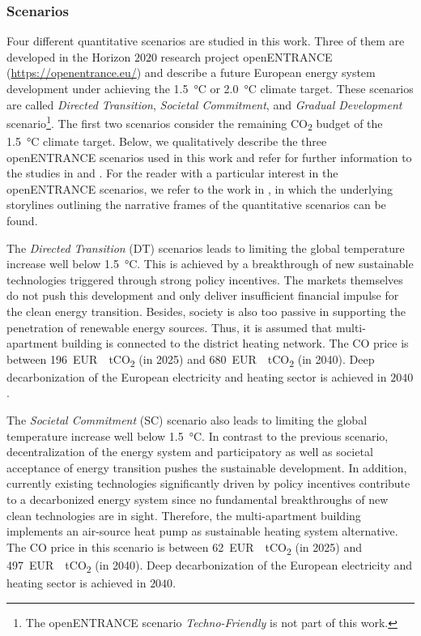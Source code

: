 \subsubsection{Scenarios}\label{sec:scenarios}
Four different quantitative scenarios are studied in this work. Three of them are developed in the Horizon $2020$ research project openENTRANCE (\url{https://openentrance.eu/}) and describe a future European energy system development under achieving the \SI{1.5}{\degreeCelsius} or \SI{2.0}{\degreeCelsius} climate target. These scenarios are called \textit{Directed Transition}, \textit{Societal Commitment}, and \textit{Gradual Development} scenario\footnote{The openENTRANCE scenario \textit{Techno-Friendly} is not part of this work.}. The first two scenarios consider the remaining CO\textsubscript{2} budget of the \SI{1.5}{\degreeCelsius} climate target. Below, we qualitatively describe the three openENTRANCE scenarios used in this work and refer for further information to the studies in \cite{auer2020development} and \cite{auer2020quantitative}. For the reader with a particular interest in the openENTRANCE scenarios, we refer to the work in \cite{auer2019quantitative}, in which the underlying storylines outlining the narrative frames
of the quantitative scenarios can be found.\vspace{0.5cm}

The \textit{Directed Transition} (DT) scenarios leads to limiting the global temperature increase well below \SI{1.5}{\degreeCelsius}. This is achieved by a breakthrough of new sustainable technologies triggered through strong policy incentives. The markets themselves do not push this development and only deliver insufficient financial impulse for the clean energy transition. Besides, society is also too passive in supporting the penetration of renewable energy sources. Thus, it is assumed that multi-apartment building is connected to the district heating network. The CO price is between \SI{196}{EUR \per tCO_{2}} (in 2025) and \SI{680}{EUR \per tCO_{2}} (in 2040). Deep decarbonization of the European electricity and heating sector is achieved in $2040$.\vspace{0.5cm}

The \textit{Societal Commitment} (SC) scenario also leads to limiting the global temperature increase well below \SI{1.5}{\degreeCelsius}. In contrast to the previous scenario, decentralization of the energy system and participatory as well as societal acceptance of energy transition pushes the sustainable development. In addition, currently existing technologies significantly driven by policy incentives contribute to a decarbonized energy system since no fundamental breakthroughs of new clean technologies are in sight. Therefore, the multi-apartment building implements an air-source heat pump as sustainable heating system alternative. The CO price in this scenario is between \SI{62}{EUR \per tCO_{2}} (in 2025) and \SI{497}{EUR \per tCO_{2}} (in 2040). Deep decarbonization of the European electricity and heating sector is achieved in $2040$.\vspace{0.5cm}

